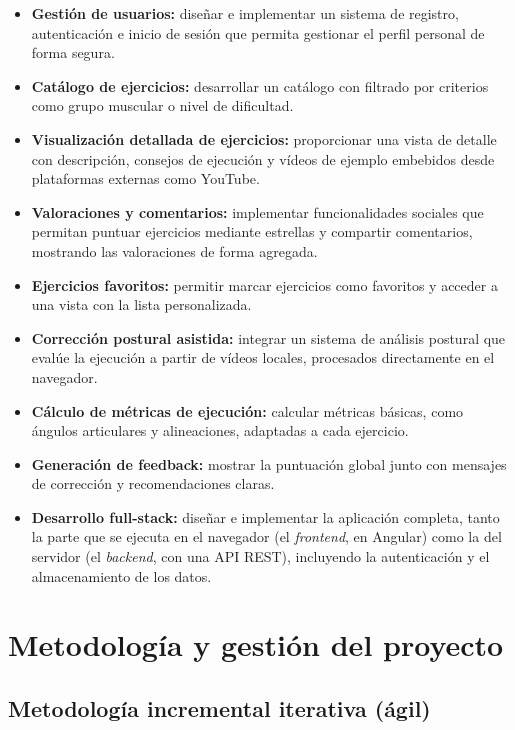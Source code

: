 \documentclass[12pt,a4paper,twoside,openright]{book}
\begin{document}
    \begin{itemize}
        \item \textbf{Gestión de usuarios:} diseñar e implementar un sistema de
        registro, autenticación e inicio de sesión que permita gestionar el
        perfil personal de forma segura.
        \item \textbf{Catálogo de ejercicios:} desarrollar un catálogo con
        filtrado por criterios como grupo muscular o nivel de dificultad.
        \item \textbf{Visualización detallada de ejercicios:} proporcionar una
        vista de detalle con descripción, consejos de ejecución y vídeos de
        ejemplo embebidos desde plataformas externas como YouTube.
        \item \textbf{Valoraciones y comentarios:} implementar funcionalidades
        sociales que permitan puntuar ejercicios mediante estrellas y compartir
        comentarios, mostrando las valoraciones de forma agregada.
        \item \textbf{Ejercicios favoritos:} permitir marcar ejercicios como
        favoritos y acceder a una vista con la lista personalizada.
        \item \textbf{Corrección postural asistida:} integrar un sistema de
        análisis postural que evalúe la ejecución a partir de vídeos locales,
        procesados directamente en el navegador.
        \item \textbf{Cálculo de métricas de ejecución:} calcular métricas
        básicas, como ángulos articulares y alineaciones, adaptadas a cada
        ejercicio.
        \item \textbf{Generación de feedback:} mostrar la puntuación global
        junto con mensajes de corrección y recomendaciones claras.
        \item \textbf{Desarrollo full-stack:} diseñar e implementar la aplicación
        completa, tanto la parte que se ejecuta en el navegador (el
        \textit{frontend}, en Angular) como la del servidor (el \textit{backend},
        con una API REST), incluyendo la autenticación y el almacenamiento de los
        datos.
    \end{itemize}


    \section{Metodología y gestión del proyecto}
    \label{subsec:metodologia}
    \subsection{Metodología incremental iterativa (ágil)}
\end{document}
